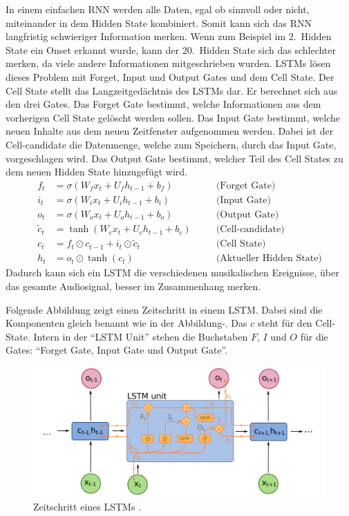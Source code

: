 In einem einfachen RNN werden alle Daten, egal ob sinnvoll oder nicht, miteinander in dem Hidden State kombiniert.
Somit kann sich das RNN langfristig schwieriger Information merken.
Wenn zum Beispiel im 2.\ Hidden State ein Onset erkannt wurde, kann der 20.\ Hidden State
sich das schlechter merken, da viele andere Informationen mitgeschrieben wurden.
LSTMs lösen dieses Problem mit Forget, Input und Output Gates und dem Cell State.
Der Cell State stellt das Langzeitgedächtnis des LSTMs dar.
Er berechnet sich aus den drei Gates.
Das Forget Gate bestimmt, welche Informationen aus dem vorherigen Cell State gelöscht werden sollen.
Das Input Gate bestimmt, welche neuen Inhalte aus dem neuen Zeitfenster aufgenommen werden.
Dabei ist der Cell-candidate die Datenmenge, welche zum Speichern, durch das Input Gate, vorgeschlagen wird.
Das Output Gate bestimmt, welcher Teil des Cell States zu dem neuen Hidden State hinzugefügt wird.
\begin{align*}
f_t &= \sigma(W_f x_t + U_f h_{t-1} + b_f) \quad &&\text{(Forget Gate)} \\
i_t &= \sigma(W_i x_t + U_i h_{t-1} + b_i) \quad &&\text{(Input Gate)} \\
o_t &= \sigma(W_o x_t + U_o h_{t-1} + b_o) \quad &&\text{(Output Gate)} \\
\tilde{c}_t &= \tanh(W_c x_t + U_c h_{t-1} + b_c) \quad &&\text{(Cell-candidate)} \\
c_t &= f_t \odot c_{t-1} + i_t \odot \tilde{c}_t \quad &&\text{(Cell State)} \\
h_t &= o_t \odot \tanh(c_t) \quad &&\text{(Aktueller Hidden State)}
\end{align*}
Dadurch kann sich ein LSTM die verschiedenen musikalischen Ereignisse,
über das gesamte Audiosignal, besser im Zusammenhang merken.

Folgende Abbildung zeigt einen Zeitschritt in einem LSTM.
Dabei sind die Komponenten gleich benannt wie in der Abbildung-.
Das $c$ steht für den Cell-State.
Intern in der \enquote{LSTM Unit} stehen die Buchstaben $F$, $I$ und $O$ für die Gates:
\enquote{Forget Gate, Input Gate und Output Gate}.
\begin{figure}[H]
    \centering
    \includegraphics[width=1\textwidth]{Graphics/LSTM_timestep}
    \caption[LSTM Zeitschritt]{Zeitschritt eines LSTMs  \cite{wikimediaRNN}.}
    \label{fig:lstm_timestep}
\end{figure}

